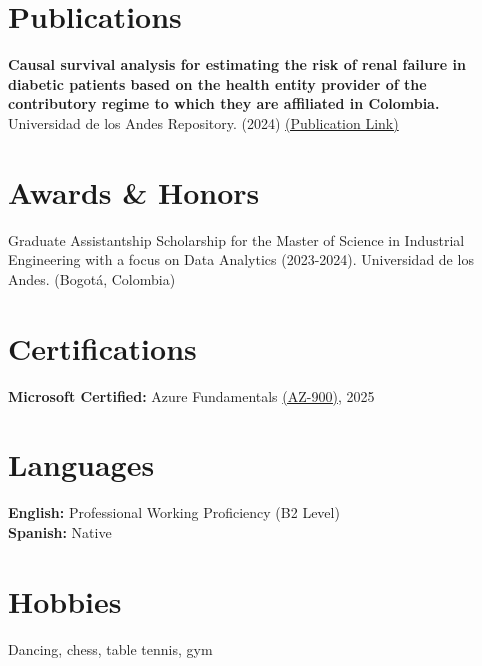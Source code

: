 \documentclass[9pt, letterpaper]{extarticle}
\begin{document}
    \section*{Publications}
        \textbf{Causal survival analysis for estimating the risk of renal failure in diabetic patients based on the health entity provider of the contributory regime to which they are affiliated in Colombia.} \\
        Universidad de los Andes Repository. (2024) \href{https://hdl.handle.net/1992/75234}{(Publication Link)}
        
    \section*{Awards \& Honors}
        Graduate Assistantship Scholarship for the Master of Science in Industrial Engineering with a focus on Data Analytics (2023-2024). Universidad de los Andes. (Bogotá, Colombia)

    \section*{Certifications}
        \textbf{Microsoft Certified:} Azure Fundamentals \href{https://learn.microsoft.com/en-us/users/jhonvega-6603/credentials/7704dbc5a72d05f?ref=https%3A%2F%2Fwww.google.com%2F}{(AZ-900)}, 2025

    \section*{Languages}
        \textbf{English:} Professional Working Proficiency (B2 Level) \\
        \textbf{Spanish:} Native

    \section*{Hobbies}
        Dancing, chess, table tennis, gym
\end{document}
